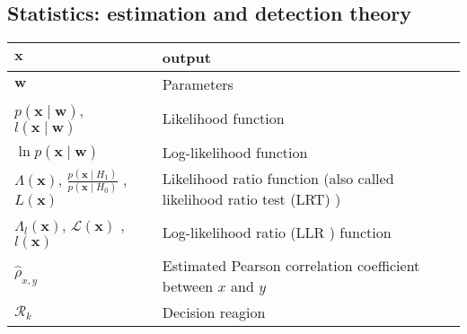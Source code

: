 \subsection{Statistics: estimation and detection theory}
\begin{xltabular}{\textwidth}{XX}
    \(\mathbf{x}\) & output \\ \hline
    \(\mathbf{w}\) & Parameters \\ \hline
	\(p(\mathbf{x} \mid \mathbf{w})\), \(l(\mathbf{x} \mid \mathbf{w})\)\cite{leon-garciaProbabilityStatisticsRandom2007}                                                                                                                                                                                                & Likelihood function                                                                     \\ \hline
	\(\ln{p(\mathbf{x} \mid \mathbf{w})}\)                                                                                                                                                                                                                                                                           & Log-likelihood function                                                                                             \\ \hline
	\(\Lambda(\mathbf{x})\)\cite{leon-garciaProbabilityStatisticsRandom2007}, \(\frac{p(\mathbf{x} \mid H_1)}{p(\mathbf{x} \mid H_0)}\) \cite{leon-garciaProbabilityStatisticsRandom2007,kayFundamentalsStatisticalProcessing2009}, \(L(\mathbf{x})\) \cite{kayFundamentalsStatisticalProcessing2009,CharlesPES} & Likelihood ratio function (also called likelihood ratio test (LRT) \cite{kayFundamentalsStatisticalProcessing2009}) \\ \hline
	\(\Lambda_l(\mathbf{x})\), \(\mathcal{L}(\mathbf{x})\) \cite{CharlesPES}, \(l(\mathbf{x})\) \cite{kayFundamentalsStatisticalProcessing2009}                                                                                                                                                                  & Log-likelihood ratio (LLR \cite{kayFundamentalsStatisticalProcessing2009}) function                                 \\ \hline
	\(\hat{\rho}_{x,y}\)                                                                                                                                                                                                                                                                                         & Estimated Pearson correlation coefficient between \(x\) and \(y\)                                                   \\ \hline
	\(\mathcal{R}_k\)                                                                                                                                                                                                                                                                                            & Decision reagion                                                                                                    \\ \hline
\end{xltabular}


